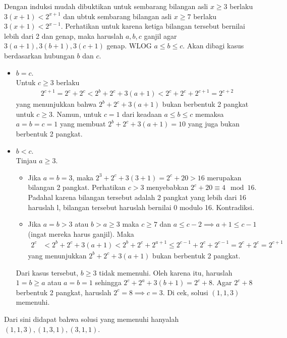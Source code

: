 
\begin{solusi}
    Dengan induksi mudah dibuktikan untuk sembarang bilangan asli $x \ge 3$  berlaku $3(x+1) < 2^{x+1}$ dan ubtuk sembarang bilangan asli $x \ge 7$ berlaku $3(x+1) < 2^{x-1}$. Perhatikan untuk karena ketiga bilangan tersebut bernilai lebih dari 2 dan genap, maka haruslah $a,b,c$ ganjil agar $3(a+1),3(b+1),3(c+1)$ genap.
    WLOG $a \le b \le c$. Akan dibagi kasus berdasarkan hubungan $b$ dan $c$.

    \begin{itemize}
        \item $b = c$.\\
        Untuk $c \ge 3$ berlaku
        \begin{align*}
            2^{c+1} = 2^c + 2^c < 2^b + 2^c + 3(a+1) < 2^c + 2^c +2^{c+1} = 2^{c+2}
        \end{align*}
        yang menunjukkan bahwa $2^b + 2^c + 3(a+1)$ bukan berbentuk 2 pangkat untuk $c \ge 3$. Namun, untuk $c=1$ dari keadaan $a \le b \le c$ memaksa $a=b=c=1$ yang membuat $2^b+2^c+3(a+1)=10$ yang juga bukan berbentuk 2 pangkat.

        \item $b < c$.\\
        Tinjau $a \ge 3$.
        \begin{itemize}
        \item Jika $a=b=3$, maka $2^3+2^c+3(3+1)=2^c+20>16$ merupakan bilangan 2 pangkat. Perhatikan $c>3$ menyebabkan $2^c+20 \equiv 4 \mod 16$. Padahal karena bilangan tersebut adalah 2 pangkat yang lebih dari 16 haruslah l, bilangan tersebut haruslah bernilai 0 modulo 16. Kontradiksi.

        \item Jika $a=b > 3$ atau $b > a \ge 3$ maka $c \ge 7$ dan $a \le c-2 \implies a+1 \le c-1$ (ingat mereka harus ganjil). Maka
        \begin{align*}
            2^{c} &< 2^b + 2^c + 3(a+1)
            < 2^b + 2^c + 2^{a+1} \le 2^{c-1} + 2^c + 2^{c-1} = 2^c + 2^{c} = 2^{c+1}
        \end{align*}
        yang menunjukkan $2^b + 2^c + 3(a+1)$ bukan berbentuk 2 pangkat.
        \end{itemize}
      
        Dari kasus tersebut, $b \ge 3$ tidak memenuhi. Oleh karena itu, haruslah $1 = b \ge a$ atau $a=b=1$ sehingga $2^c+2^a+3(b+1)=2^c+8$. Agar $2^c+8$ berbentuk 2 pangkat, haruslah $2^c=8 \implies c=3$. Di cek, solusi $(1,1,3)$ memenuhi.
    \end{itemize}
    Dari sini didapat bahwa solusi yang memenuhi hanyalah $(1,1,3), (1,3,1), (3,1,1)$.
\end{solusi}